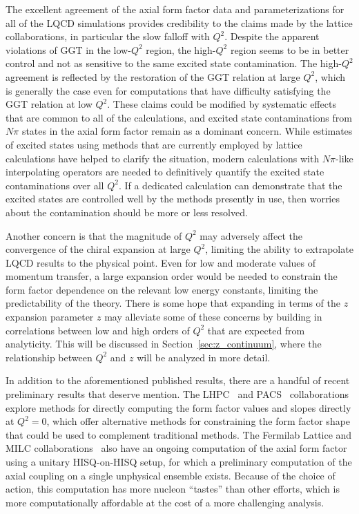 \documentclass{ar-1col}
\begin{document}
The excellent agreement of the axial form factor data and parameterizations
 for all of the LQCD simulations provides credibility to the claims
 made by the lattice collaborations, in particular the slow falloff with $Q^2$.
Despite the apparent violations of GGT in the low-$Q^2$ region,
 the high-$Q^2$ region seems to be in better control and not as sensitive to
 the same excited state contamination.
The high-$Q^2$ agreement is reflected by the restoration of the GGT relation at large $Q^2$,
 which is generally the case even for computations that have difficulty satisfying
 the GGT relation at low $Q^2$.
These claims could be modified by systematic effects
 that are common to all of the calculations,
 and excited state contaminations from $N\pi$ states in
 the axial form factor remain as a dominant concern.
While estimates of excited states using methods that are currently employed
 by lattice calculations have helped to clarify the situation,
 modern calculations with $N\pi$-like interpolating operators
 are needed to definitively quantify the excited state contaminations over all $Q^2$.
If a dedicated calculation can demonstrate that the
 excited states are controlled well by the methods presently in use,
 then worries about the contamination should be more or less resolved.

Another concern is that the magnitude of $Q^2$ may adversely affect
 the convergence of the chiral expansion at large $Q^2$,
 limiting the ability to extrapolate LQCD results to the physical point.
Even for low and moderate values of momentum transfer,
 a large expansion order would be needed to constrain the form factor
 dependence on the relevant low energy constants,
 limiting the predictability of the theory.
There is some hope that expanding in terms of the $z$ expansion parameter $z$
 may alleviate some of these concerns by building in correlations between
 low and high orders of $Q^2$ that are expected from analyticity.
This will be discussed in Section~\ref{sec:z_continuum},
 where the relationship between $Q^2$ and $z$ will be analyzed in more detail.


In addition to the aforementioned published results, there are
 a handful of recent preliminary results that deserve mention.
The LHPC~\cite{Hasan:2017wwt} and PACS~\cite{Ishikawa:2021eut} collaborations
 explore methods for directly computing the form factor values and slopes
 directly at $Q^2=0$, which offer alternative methods for constraining
 the form factor shape that could be used to complement traditional methods.
The Fermilab Lattice and MILC collaborations~\cite{Meyer:2016kwb,Lin:2019pia,Lin:2020wko} also have an ongoing
 computation of the axial form factor using a unitary HISQ-on-HISQ setup,
 for which a preliminary computation of the axial coupling on
 a single unphysical ensemble exists.
Because of the choice of action, this computation has more nucleon ``tastes''
 than other efforts, which is more computationally affordable
 at the cost of a more challenging analysis.
\end{document}
